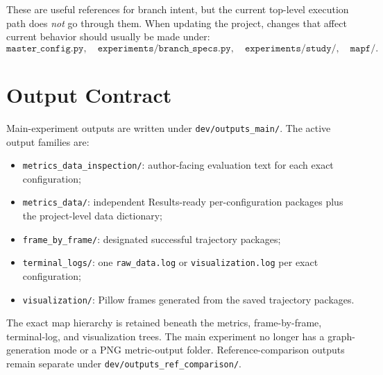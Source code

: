 \documentclass[11pt]{article}
\begin{document}
These are useful references for branch intent, but the current top-level execution path does \emph{not} go through them. When updating the project, changes that affect current behavior should usually be made under:
\[
\texttt{master\_config.py},\quad
\texttt{experiments/branch\_specs.py},\quad
\texttt{experiments/study/},\quad
\texttt{mapf/}.
\]

\section{Output Contract}

Main-experiment outputs are written under \texttt{dev/outputs\_main/}. The active output families are:
\begin{itemize}[leftmargin=2em]
    \item \texttt{metrics\_data\_inspection/}: author-facing evaluation text for each exact configuration;
    \item \texttt{metrics\_data/}: independent Results-ready per-configuration packages plus the project-level data dictionary;
    \item \texttt{frame\_by\_frame/}: designated successful trajectory packages;
    \item \texttt{terminal\_logs/}: one \texttt{raw\_data.log} or \texttt{visualization.log} per exact configuration;
    \item \texttt{visualization/}: Pillow frames generated from the saved trajectory packages.
\end{itemize}

The exact map hierarchy is retained beneath the metrics, frame-by-frame, terminal-log, and visualization trees. The main experiment no longer has a graph-generation mode or a PNG metric-output folder. Reference-comparison outputs remain separate under \texttt{dev/outputs\_ref\_comparison/}.
\end{document}
